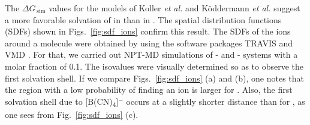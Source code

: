 \documentclass[3p,twocolumn]{elsarticle}
\begin{document}
The $\Delta G_{\, \text{sim}}$ values for the models of Koller \textit{et al.} \cite{Koller_2012} and K\"{o}ddermann \textit{et al.} \cite{K_ddermann_2007} suggest a more favorable solvation of  in \ce{[emim][B(CN)_4]} than in \ce{[emim][NTf_2]}. 
The spatial distribution functions (SDFs) \cite{Svishchev_1993} shown in Figs.~\ref{fig:sdf_ions} confirm this result.
The SDFs of the ions around a  molecule were obtained by using the software packages TRAVIS \cite{Brehm_2011} and VMD \cite{HUMP96}.
For that, we carried out NPT-MD simulations of -\ce{[emim][B(CN)_4]} and -\ce{[emim][NTf_2]} systems with a  molar fraction of 0.1.
The isovalues were visually determined so as to observe the first solvation shell.
If we compare Figs.~\ref{fig:sdf_ions} (a) and (b), one notes that the region with a low probability of finding an ion is larger for \ce{[emim][NTf_2]}.
Also, the first solvation shell due to [B(CN)\textsubscript{4}]$^{-}$ occurs at a slightly shorter distance than for \ce{[NTf_2]^-}, as one sees from Fig.~\ref{fig:sdf_ions} (c).
\end{document}
